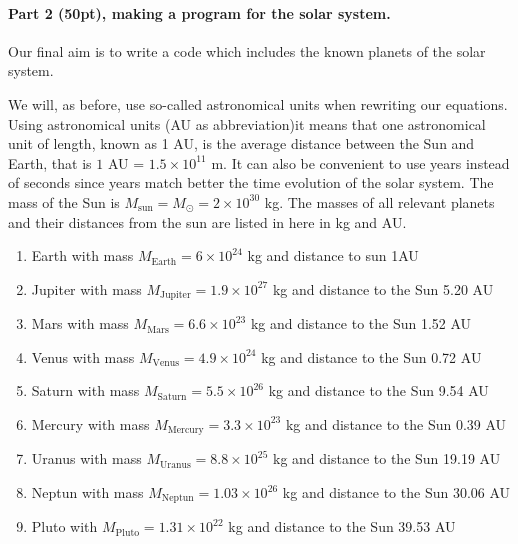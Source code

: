 \documentclass[%
oneside,                 %
final,                   %
10pt]{article}
\begin{document}
\noindent
\paragraph{Part 2 (50pt), making a program for the solar system.}
Our final aim is to write a code which includes the known planets of the solar system. 

We will, as before, use so-called astronomical units when rewriting our equations. 
Using astronomical units (AU as abbreviation)it means that 
one astronomical unit of length, known as 1 AU, is the average distance between the Sun and Earth, that is
$1$ AU = $1.5\times 10^{11}$ m.  It can also be convenient to use years instead of seconds since years match
better the time evolution of the solar system. The mass of the Sun is $M_{\mathrm{sun}}=M_{\odot}=2\times 10^{30}$ kg. The masses of all relevant planets and their distances from the sun are listed in here in kg and AU.

\begin{enumerate}
\item Earth with mass  $M_{\mathrm{Earth}}=6\times 10^{24}$ kg and distance to sun  1AU

\item Jupiter with mass  $M_{\mathrm{Jupiter}}=1.9\times 10^{27}$ kg and distance to the Sun 5.20 AU

\item Mars  with mass $M_{\mathrm{Mars}}=6.6\times 10^{23}$ kg and distance to the Sun 1.52 AU 

\item Venus with mass $M_{\mathrm{Venus}}=4.9\times 10^{24}$ kg and distance to the Sun 0.72 AU 

\item Saturn with mass $M_{\mathrm{Saturn}}=5.5\times 10^{26}$ kg and distance to the Sun 9.54 AU 

\item Mercury with mass $M_{\mathrm{Mercury}}=3.3\times 10^{23}$ kg and distance to the Sun 0.39 AU

\item Uranus  with mass $M_{\mathrm{Uranus}}=8.8\times 10^{25}$ kg and distance to the Sun 19.19 AU

\item Neptun with mass $M_{\mathrm{Neptun}}=1.03\times 10^{26}$ kg and distance to the Sun 30.06 AU

\item Pluto with  $M_{\mathrm{Pluto}}=1.31\times 10^{22}$ kg  and distance to the Sun 39.53 AU
\end{enumerate}
\end{document}
